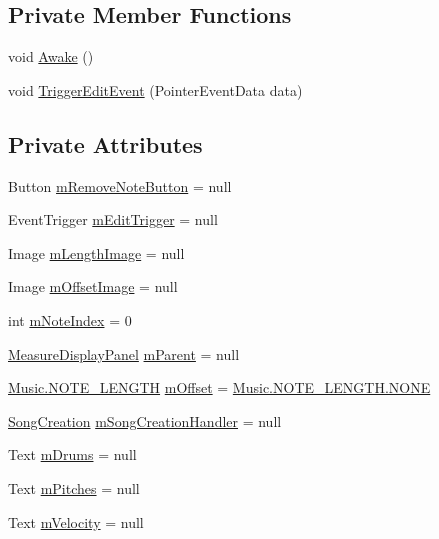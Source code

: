 \subsection*{Private Member Functions}
\begin{DoxyCompactItemize}
\item 
void \hyperlink{class_song_creation_1_1_note_display_panel_a2f5eee7e81aa047949e69be9f0877a67}{Awake} ()
\item 
void \hyperlink{class_song_creation_1_1_note_display_panel_a56b230f3141d57f1c11dd342b352eaa3}{Trigger\+Edit\+Event} (Pointer\+Event\+Data data)
\end{DoxyCompactItemize}
\subsection*{Private Attributes}
\begin{DoxyCompactItemize}
\item 
Button \hyperlink{class_song_creation_1_1_note_display_panel_a3e533974552d5c029c1de67b6bd1c2da}{m\+Remove\+Note\+Button} = null
\item 
Event\+Trigger \hyperlink{class_song_creation_1_1_note_display_panel_af2efb7939acf869e9a4e18ea31baa4e2}{m\+Edit\+Trigger} = null
\item 
Image \hyperlink{class_song_creation_1_1_note_display_panel_a88560efe222dafc26795c508bcf5b5a2}{m\+Length\+Image} = null
\item 
Image \hyperlink{class_song_creation_1_1_note_display_panel_a9a63fa0205fec1d90c093ad4174aed00}{m\+Offset\+Image} = null
\item 
int \hyperlink{class_song_creation_1_1_note_display_panel_a383f4e592812c12028e0ff3f7aec0980}{m\+Note\+Index} = 0
\item 
\hyperlink{class_song_creation_1_1_measure_display_panel}{Measure\+Display\+Panel} \hyperlink{class_song_creation_1_1_note_display_panel_aa0d0186ce889ffd63cfe7587f48463c9}{m\+Parent} = null
\item 
\hyperlink{group___music_enums_gaf11b5f079adbb21c800b9eca1c5c3cbd}{Music.\+N\+O\+T\+E\+\_\+\+L\+E\+N\+G\+TH} \hyperlink{class_song_creation_1_1_note_display_panel_ae1943fcafd54133bbc3e387cc49473b8}{m\+Offset} = \hyperlink{group___music_enums_ggaf11b5f079adbb21c800b9eca1c5c3cbdab50339a10e1de285ac99d4c3990b8693}{Music.\+N\+O\+T\+E\+\_\+\+L\+E\+N\+G\+T\+H.\+N\+O\+NE}
\item 
\hyperlink{class_song_creation}{Song\+Creation} \hyperlink{class_song_creation_1_1_note_display_panel_ab11cc1ad87541ada65b36e010d9c56c3}{m\+Song\+Creation\+Handler} = null
\item 
Text \hyperlink{class_song_creation_1_1_note_display_panel_a7a6d14026ca347c32b2842d5c9dc54e9}{m\+Drums} = null
\item 
Text \hyperlink{class_song_creation_1_1_note_display_panel_a1bab51528899c56a7944e7d19ec3d8bb}{m\+Pitches} = null
\item 
Text \hyperlink{class_song_creation_1_1_note_display_panel_a3e9bb032c809e27c4ce277c532e4ff66}{m\+Velocity} = null
\end{DoxyCompactItemize}


